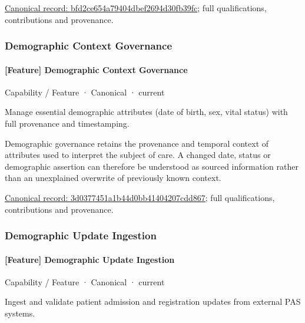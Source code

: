 {\footnotesize \href{../../../../continuum/strategy/capability/feature/bfd2ce654a79404dbef2694d30fb39fc.md}{Canonical record: bfd2ce654a79404dbef2694d30fb39fc}; full qualifications, contributions and provenance.}\par
\subsubsection{Demographic Context Governance}

\paragraph{[Feature] Demographic Context Governance}

\label{element:3d0377451a1b44d0bb41404207cdd867}
{\small Capability / Feature · Canonical · current}\par

Manage essential demographic attributes (date of birth, sex, vital status) with full provenance and timestamping.



Demographic governance retains the provenance and temporal context of attributes used to interpret the subject of care. A changed date, status or demographic assertion can therefore be understood as sourced information rather than an unexplained overwrite of previously known context.


{\footnotesize \href{../../../../continuum/strategy/capability/feature/3d0377451a1b44d0bb41404207cdd867.md}{Canonical record: 3d0377451a1b44d0bb41404207cdd867}; full qualifications, contributions and provenance.}\par
\subsubsection{Demographic Update Ingestion}

\paragraph{[Feature] Demographic Update Ingestion}

\label{element:594ccbd95f5841e4b874fd1bade34a5d}
{\small Capability / Feature · Canonical · current}\par

Ingest and validate patient admission and registration updates from external PAS systems.



